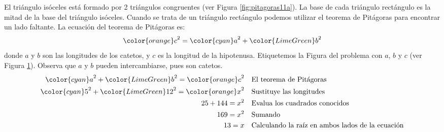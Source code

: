 \begin{solutionbox}{15cm}
\begin{minipage}{0.35\textwidth}
\begin{figure}[H]
            \caption{}
            \label{fig:pitagoras11b}
        \end{figure}
    \end{minipage}\hfill
    \begin{minipage}{0.6\textwidth}
        El triángulo isóceles está formado por 2 triángulos congruentes (ver Figura \ref{fig:pitagoras11a}).
        La base de cada triángulo rectángulo es la mitad de la base del triángulo isóceles.
        Cuando se trata de un triángulo rectángulo podemos utilizar el teorema de Pitágoras para encontrar un lado faltante.
        La ecuación del teorema de Pitágoras es:
        \[{\color{orange}c}^2={\color{cyan}a}^2+{\color{LimeGreen}b}^2\]
        donde $a$ y $b$ son las longitudes de los catetos, y $c$ es la longitud de la hipotenusa.
        Etiquetemos la Figura del problema con $a$, $b$ y $c$ (ver Figura \ref{fig:pitagoras11b}).
        Observa que $a$ y $b$ pueden intercambiarse, pues son catetos.
        \begin{align*}
            {\color{cyan}a}^2+{\color{LimeGreen}b}^2  ={\color{orange}c}^2  & \text{\quad El teorema de Pitágoras}                          \\
            {\color{cyan}5}^2+{\color{LimeGreen}12}^2  ={\color{orange}x}^2 & \text{\quad Sustituye las longitudes}                         \\
            25+144  =x^2                                                    & \text{\quad Evalua los cuadrados conocidos}                   \\
            169=x^2                                                         & \text{\quad Sumando }                                         \\
            13=x                                                            & \text{\quad Calculando la raíz en ambos lados de la ecuación} \\
        \end{align*}
    \end{minipage}
\end{solutionbox}
